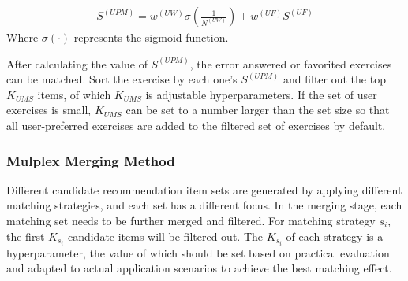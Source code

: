 \begin{align}
    S^{(UPM)} = w^{(UW)}\sigma({\frac{1}{N^{(UW)}}}) + w^{(UF)}S^{(UF)} \label{fml:ch4-upbms}
\end{align}
Where \(\sigma(\cdot)\) represents the sigmoid function.

After calculating the value of \(S^{(UPM)}\), the error answered or favorited exercises can be matched. Sort the exercise by each one's \(S^{(UPM)}\) and filter out the top \(K_{UMS}\) items, of which \(K_{UMS}\) is adjustable hyperparameters. If the set of user exercises is small, \(K_{UMS}\) can be set to a number larger than the set size so that all user-preferred exercises are added to the filtered set of exercises by default.

\subsubsection{Mulplex Merging Method}


Different candidate recommendation item sets are generated by applying different matching strategies, and each set has a different focus. In the merging stage, each matching set needs to be further merged and filtered. For matching strategy \(s_i\), the first \(K_{s_i}\) candidate items will be filtered out. The \(K_{s_i}\) of each strategy is a hyperparameter, the value of which should be set based on practical evaluation and adapted to actual application scenarios to achieve the best matching effect.

